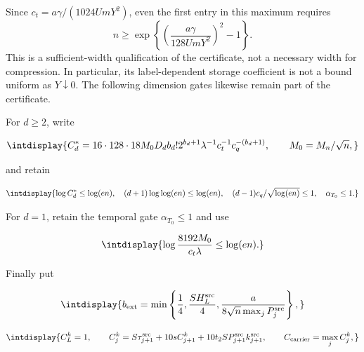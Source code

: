 Since \(c_t=a\gamma/(1024UmY^2)\), even the first entry in this
maximum requires
\[
 n\ge\exp\!\left\{\left(\frac{a\gamma}{128UmY^2}\right)^2-1\right\}.
\]
This is a sufficient-width qualification of the certificate, not a
necessary width for compression. In particular, its label-dependent
storage coefficient is not a bound uniform as \(Y\downarrow0\).
The following dimension gates likewise remain part of the certificate.


For \(d\ge2\), write


\begingroup\renewcommand{\theHequation}{intdisplay.196}
\begin{equation*}
\intdisplay{
C_d^*=16\cdot128\cdot18M_0D_db_d!2^{b_d+1}
          \lambda^{-1}c_t^{-1}c_q^{-(b_d+1)},\qquad M_0=M_n/\sqrt n,
}
\end{equation*}
\endgroup


and retain


\begingroup\renewcommand{\theHequation}{intdisplay.197}
\begin{equation}
\intdisplay{
\log C_d^*\le\log(en),\quad
(d+1)\log\log(en)\le\log(en),\quad
(d-1)c_q/\sqrt{\log(en)}\le1,\quad \alpha_{T_0}\le1.
}
\label{int:eq-0084-harmonic-original-counting-gates}
\end{equation}
\endgroup


For \(d=1\), retain the temporal gate \(\alpha_{T_0}\le1\) and use


\begingroup\renewcommand{\theHequation}{intdisplay.198}
\begin{equation}
\intdisplay{
\log\frac{8192M_0}{c_t\lambda}\le\log(en).
}
\label{int:eq-0085-harmonic-dimension-one-gate}
\end{equation}
\endgroup


Finally put


\begingroup\renewcommand{\theHequation}{intdisplay.199}
\begin{equation*}
\intdisplay{
b_{\rm ext}=\min\left\{\frac14,\frac{SH_L^{\rm src}}4,
                 \frac{a}{8\sqrt n\max_jP_j^{\rm src}}\right\},
}
\end{equation*}
\endgroup

\begingroup\renewcommand{\theHequation}{intdisplay.200}
\begin{equation*}
\intdisplay{
C_L^k=1,\qquad C_j^k=S\tau_{j+1}^{\rm src}+10sC_{j+1}^k
           +10t_2SP_{j+1}^{\rm src}k_{j+1}^{\rm src},\qquad
C_{\rm carrier}=\max_jC_j^k,
}
\end{equation*}
\endgroup

